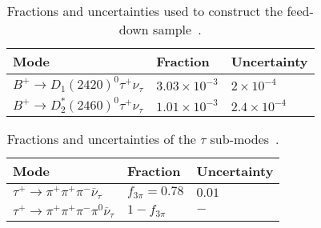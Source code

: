  
    
{
\renewcommand{\arraystretch}{1.25}
 \begin{table}
\centering
\scriptsize
\begin{tabular}{l | l | l }
Mode & Fraction & Uncertainty \\
\hline

$B^{+} \rightarrow D_{1}(2420)^{0} \tau^{+}\nu_{\tau}$ & $3.03\times10^{-3}$  & $2\times 10^{-4}$\\\hline
$B^{+} \rightarrow D_{2}^{*}(2460)^{0} \tau^{+}  \nu_{\tau}$  & $1.01 \times 10^{-3}$ &$2.4 \times 10^{-4}$\\

\end{tabular}
\caption{Fractions and uncertainties used to construct the feed-down sample~\cite{PhysRevD.98.030001}.}
\label{tab:Ds_bkg_modes}
\end{table}
    }
    
{
\renewcommand{\arraystretch}{1.25}
 \begin{table}
\centering
\scriptsize
\begin{tabular}{l | l | l }
Mode & Fraction & Uncertainty \\
\hline

$\tau^{+} \rightarrow \pi^{+} \pi^{+} \pi^{-} \overline{\nu}_{\tau}$ & $f_{3\pi}=0.78$  & $0.01$\\\hline
$\tau^{+} \rightarrow \pi^{+} \pi^{+} \pi^{-} \pi^{0} \overline{\nu}_{\tau}$  & $1-f_{3\pi}$ &$-$\\

\end{tabular}
\caption{Fractions and uncertainties of the $\tau$ sub-modes~\cite{PhysRevD.97.072013}.}
\label{tab:Ds_bkg_modes}
\end{table}
    }
    







